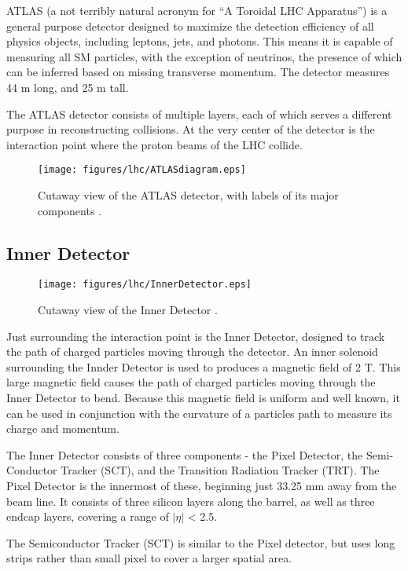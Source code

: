 ATLAS (a not terribly natural acronym for ``A Toroidal LHC Apparatus'') is a general purpose detector designed to maximize the detection efficiency of all physics objects, including leptons, jets, and photons. This means it is capable of measuring all SM particles, with the exception of neutrinos, the presence of which can be inferred based on missing transverse momentum. The detector measures 44 m long, and 25 m tall. 

The ATLAS detector consists of multiple layers, each of which serves a different purpose in reconstructing collisions. At the very center of the detector is the interaction point where the proton beams of the LHC collide. 

\begin{figure}[H]
\centering
   \texttt{[image: figures/lhc/ATLASdiagram.eps]}
\caption{Cutaway view of the ATLAS detector, with labels of its major components \cite{}.}
\label{fig:ATLAS}
\end{figure}

\subsection{Inner Detector}
\label{sec:innerDetector}

\begin{figure}[H]
\centering
   \texttt{[image: figures/lhc/InnerDetector.eps]}
\caption{Cutaway view of the Inner Detector \cite{}.}
\label{fig:innerDect}
\end{figure}

Just surrounding the interaction point is the Inner Detector, designed to track the path of charged particles moving through the detector. An inner solenoid surrounding the Innder Detector is used to produces a magnetic field of 2 T. This large magnetic field causes the path of charged particles moving through the Inner Detector to bend. Because this magnetic field is uniform and well known, it can be used in conjunction with the curvature of a particles path to measure its charge and momentum.

The Inner Detector consists of three components - the Pixel Detector, the Semi-Conductor Tracker (SCT), and the Transition Radiation Tracker (TRT). The Pixel Detector is the innermost of these, beginning just 33.25 mm away from the beam line. It consists of three silicon layers along the barrel, as well as three endcap layers, covering a range of $|\eta|$ < 2.5. 

The Semiconductor Tracker (SCT) is similar to the Pixel detector, but uses long strips rather than small pixel to cover a larger spatial area.

